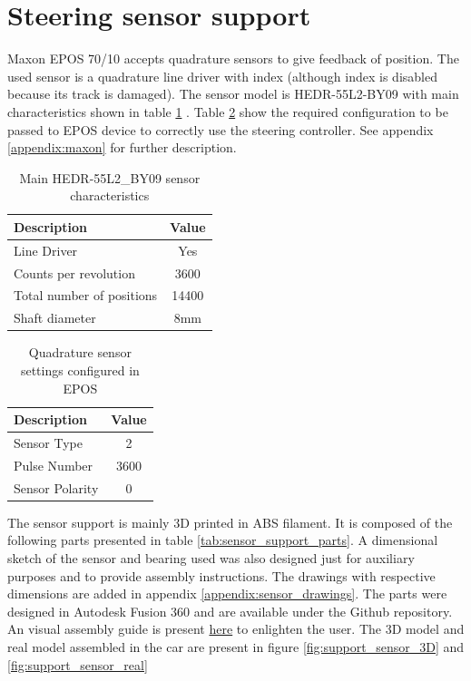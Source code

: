 \section{Steering sensor support}
Maxon EPOS 70/10 accepts quadrature sensors to give feedback of position. The used sensor is a quadrature line driver with index (although index is disabled because its track is damaged). The sensor model is HEDR-55L2-BY09 with main characteristics shown in table \ref{tab:quad_sensor} \cite{hedr_sensor}. Table \ref{tab:quad_sensor_settings} show the required configuration to be passed to EPOS device to correctly use the steering controller. See appendix \ref{appendix:maxon} for further description.
\begin{table}[!hb]
	\centering
	\begin{tabular}{lc}
		\toprule
		\textbf{Description} & \textbf{Value}\\
		\midrule
		Line Driver & Yes\\
		Counts per revolution & 3600\\
		Total number of positions & 14400\\
		Shaft diameter & 8mm\\
		\bottomrule
	\end{tabular}
	\caption{Main HEDR-55L2\_BY09 sensor characteristics}
	\label{tab:quad_sensor}
\end{table}

\begin{table}[!hb]
	\centering
	\begin{tabular}{lc}
		\toprule
		\textbf{Description} & \textbf{Value}\\
		\midrule
		Sensor Type & 2\\
		Pulse Number & 3600\\
		Sensor Polarity & 0\\
		\bottomrule
	\end{tabular}
	\caption{Quadrature sensor settings configured in EPOS}
	\label{tab:quad_sensor_settings}
\end{table}

The sensor support is mainly 3D printed in ABS filament. It is composed of the following parts presented in table \ref{tab:sensor_support_parts}.
A dimensional sketch of the sensor and bearing used was also designed just for auxiliary purposes and to provide assembly instructions. The drawings with respective dimensions are added in appendix \ref{appendix:sensor_drawings}. The parts were designed in Autodesk Fusion 360 and are available under the Github repository. An visual assembly guide is present \href{https://youtu.be/ljlZEBviRYQ}{here} to enlighten the user. The 3D model and real model assembled in the car are present in figure \ref{fig:support_sensor_3D} and \ref{fig:support_sensor_real}

